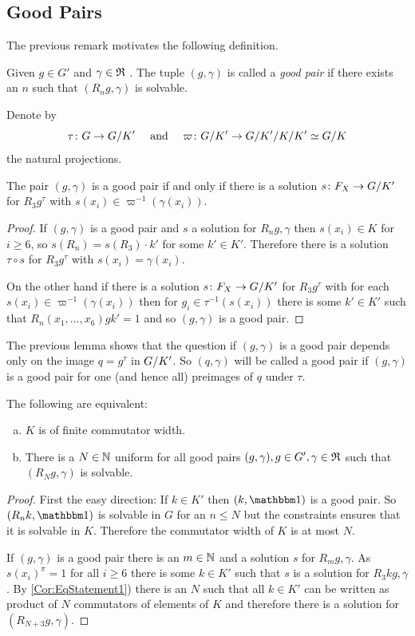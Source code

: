 \documentclass[a4paper,11pt]{amsart}
\begin{document}
\subsection{Good Pairs}\label{sec:good_pairs}
The previous remark motivates the following definition.
\begin{defi}
Given $g\in G'$ and $\gamma\in\mathfrak{R}$ . The tuple $(g,\gamma)$ is called a \emph{good pair} if there exists an $n$ such that
$(R_ng,\gamma)$ is solvable.  
\end{defi}

\begin{lem}
 Denote by 
 \[\tau\colon G\to{G/K'}\quad\text{ and }\quad\varpi\colon {G/K'} \to {{G/K'}/{K/K'}}\simeq {G/K}\]
 the natural projections.
 
 The pair $(g,\gamma)$ is a good pair if and only if there is a solution $s\colon F_X \to {G/K'}$ for $R_3g^\tau$ with $s(x_i) \in \varpi^{-1}(\gamma(x_i))$. 
\end{lem}
\begin{proof}
 If $(g,\gamma)$ is a good pair and $s$ a solution for $R_ng,\gamma$ 
 then $s(x_i)\in K$ for $i\geq6$, so $s(R_n) = s(R_3) \cdot k'$ for some $k'\in K'$. 
 Therefore there is a solution $\tau\circ s$ for $R_3g^\tau$ with $s(x_i) = \gamma(x_i)$.
 
 On the other hand if there is a solution $s\colon F_X \to {G/K'}$ for $R_3g^\tau$ with for each $s(x_i) \in \varpi^{-1}(\gamma(x_i))$ then
 for $g_i \in \tau^{-1}(s(x_i))$ there is some $k'\in K'$ such that $R_n(x_1,\ldots,x_6)gk'=1$ and so $(g,\gamma)$ is a good pair.
\end{proof}
The previous lemma shows that the question if $(g,\gamma)$ is a good pair depends only on the image $q=g^\tau$ in ${G/K'}$. So 
$(q,\gamma)$ will be called a good pair if $(g,\gamma)$ is a good pair for one (and hence all) preimages of $q$ under $\tau$.
\begin{cor}\label{cor:finiteCommutatorWidthKimpliesBoundedConstraintedCommutators}
The following are equivalent:
\begin{enumerate}[a)]
 \item $K$ is of finite commutator width. \label{Cor:EqStatement1}
 \item There is a $N\in\mathbb{N}$ uniform for all good pairs $(g,\gamma),g \in G',\gamma\in\mathfrak{R}$ such that $(R_Ng,\gamma)$ is solvable.
\end{enumerate}
\end{cor}
\begin{proof}
 First the easy direction: If $k\in K'$ then $(k,\id)$ is a good pair. So $(R_nk,\id)$ is solvable in $G$ for an $n\leq N$ but the constraints ensures that it is solvable in $K$.
 Therefore the commutator width of $K$ is at most $N$.
 
 If $(g,\gamma)$ is a good pair there is an $m\in \mathbb{N}$ and a solution $s$ for $R_mg,\gamma$. As $s(x_i)^\pi =1$ for all $i\geq 6$ there is some $k\in K'$ such that $s$ is 
 a solution for $R_3kg,\gamma$. By \ref{Cor:EqStatement1}) there is an $N$ such that all $k\in K'$ can be written as product of $N$ commutators of elements of $K$ and
 therefore there is a solution for $(R_{N+3}g,\gamma)$.
\end{proof}
\end{document}

